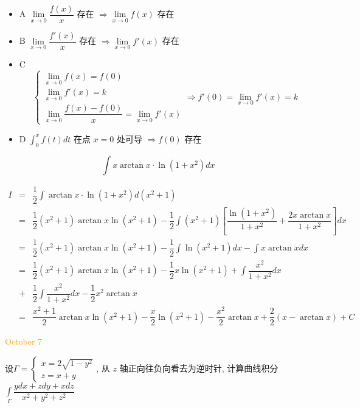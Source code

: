 \begin{solution}
	\begin{itemize}
		\item A $\lim\limits_{x\to 0}\dfrac{f(x)}{x}$ 存在 $\Rightarrow \lim\limits_{x\to 0}f(x)$ 存在
		\item B $\lim\limits_{x\to 0}\dfrac{f'(x)}{x}$ 存在 $\Rightarrow \lim\limits_{x\to 0}f'(x)$ 存在
		\item C 
		$$
		\begin{cases}
			\lim\limits_{x\to 0}f(x) = f(0) \\
			\lim\limits_{x\to 0}f'(x) = k\\
		    \lim\limits_{x\to 0}\dfrac{f(x)-f(0)}{x} = \lim\limits_{x\to 0}f'(x)
		\end{cases}
		\Rightarrow f'(0) = \lim\limits_{x\to 0}f'(x) = k
		$$
		\item D $\int_{0}^{x}f(t)dt$ 在点 $x=0$ 处可导 $\Rightarrow f(0)$ 存在
	\end{itemize}
\end{solution}

\begin{example}[][Exam: 36.1.12]
	$$\int x\arctan x\cdot \ln(1+x^2)dx$$
\end{example}

\begin{solution}

	\begin{eqnarray*}
		I & = & \dfrac{1}{2}\int \arctan x\cdot \ln(1+x^2)d(x^2+1)\\
		  & = & \dfrac{1}{2}(x^2+1)\arctan x\ln(x^2+1)-\dfrac{1}{2}\int (x^{2}+1)\left[\dfrac{\ln(1+x^{2})}{1+x^{2}}+\dfrac{2x\arctan x}{1+x^{2}}\right]dx\\
		  & = & \dfrac{1}{2}(x^2+1)\arctan x\ln(x^2+1)-\dfrac{1}{2}\int \ln(x^2+1)dx-\int x\arctan xdx\\
		  & = & \dfrac{1}{2}(x^2+1)\arctan x\ln(x^2+1)-\dfrac{1}{2}x\ln(x^2+1) + \int \dfrac{x^{2}}{1+x^{2}}dx\\
		  & + & \dfrac{1}{2}\int \dfrac{x^{2}}{1+x^{2}}dx - \dfrac{1}{2}x^2\arctan x\\
		  & = & \dfrac{x^{2}+1}{2}\arctan x\ln(x^{2}+1) -\dfrac{x}{2}\ln(x^{2}+1) - \dfrac{x^{2}}{2}\arctan x +\dfrac{2}{2}(x-\arctan x) + C
	\end{eqnarray*}
\end{solution}


\textcolor{orange}{October 7}

\begin{example}[][Exam: 36.1.13]
	设$\varGamma = 
\begin{cases}
	x = 2\sqrt{1-y^2}\\
	z = x+y
\end{cases}$, 从 $z$ 轴正向往负向看去为逆时针, 计算曲线积分 
$\displaystyle{\int\limits_{\varGamma}\dfrac{ydx+zdy+xdz}{x^2+y^2+z^2}}$
\end{example}

